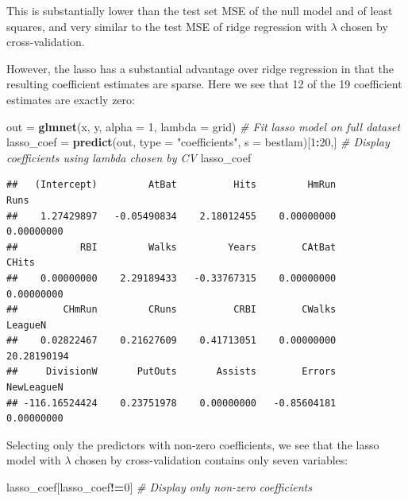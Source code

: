 \documentclass[openany]{book}
\newenvironment{Shaded}{\begin{snugshade}}{\end{snugshade}}
\newcommand{\CommentTok}[1]{\textcolor[rgb]{0.56,0.35,0.01}{\textit{#1}}}
\newcommand{\DataTypeTok}[1]{\textcolor[rgb]{0.13,0.29,0.53}{#1}}
\newcommand{\DecValTok}[1]{\textcolor[rgb]{0.00,0.00,0.81}{#1}}
\newcommand{\KeywordTok}[1]{\textcolor[rgb]{0.13,0.29,0.53}{\textbf{#1}}}
\newcommand{\NormalTok}[1]{#1}
\newcommand{\OperatorTok}[1]{\textcolor[rgb]{0.81,0.36,0.00}{\textbf{#1}}}
\newcommand{\StringTok}[1]{\textcolor[rgb]{0.31,0.60,0.02}{#1}}
\begin{document}
This is substantially lower than the test set MSE of the null model and of
least squares, and very similar to the test MSE of ridge regression with \(\lambda\)
chosen by cross-validation.

However, the lasso has a substantial advantage over ridge regression in
that the resulting coefficient estimates are sparse. Here we see that 12 of
the 19 coefficient estimates are exactly zero:

\begin{Shaded}
\begin{Highlighting}[]
\NormalTok{out =}\StringTok{ }\KeywordTok{glmnet}\NormalTok{(x, y, }\DataTypeTok{alpha =} \DecValTok{1}\NormalTok{, }\DataTypeTok{lambda =}\NormalTok{ grid) }\CommentTok{# Fit lasso model on full dataset}
\NormalTok{lasso_coef =}\StringTok{ }\KeywordTok{predict}\NormalTok{(out, }\DataTypeTok{type =} \StringTok{"coefficients"}\NormalTok{, }\DataTypeTok{s =}\NormalTok{ bestlam)[}\DecValTok{1}\OperatorTok{:}\DecValTok{20}\NormalTok{,] }\CommentTok{# Display coefficients using lambda chosen by CV}
\NormalTok{lasso_coef}
\end{Highlighting}
\end{Shaded}

\begin{verbatim}
##   (Intercept)         AtBat          Hits         HmRun          Runs 
##    1.27429897   -0.05490834    2.18012455    0.00000000    0.00000000 
##           RBI         Walks         Years        CAtBat         CHits 
##    0.00000000    2.29189433   -0.33767315    0.00000000    0.00000000 
##        CHmRun         CRuns          CRBI        CWalks       LeagueN 
##    0.02822467    0.21627609    0.41713051    0.00000000   20.28190194 
##     DivisionW       PutOuts       Assists        Errors    NewLeagueN 
## -116.16524424    0.23751978    0.00000000   -0.85604181    0.00000000
\end{verbatim}

Selecting only the predictors with non-zero coefficients, we see that the lasso model with \(\lambda\)
chosen by cross-validation contains only seven variables:

\begin{Shaded}
\begin{Highlighting}[]
\NormalTok{lasso_coef[lasso_coef}\OperatorTok{!=}\DecValTok{0}\NormalTok{] }\CommentTok{# Display only non-zero coefficients}
\end{Highlighting}
\end{Shaded}
\end{document}
